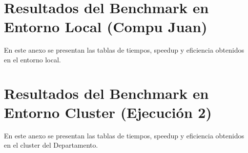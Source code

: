 \documentclass[a4paper,12pt,oneside,spanish]{book}
\begin{document}
    \pagestyle{plain}

    \tableofcontents
    \clearpage

    \mainmatter%
    
    
    
    
    

    \appendix
    
    \chapter{Resultados del Benchmark en Entorno Local (Compu Juan)}
    \label{appendix:local}
    En este anexo se presentan las tablas de tiempos, speedup y eficiencia obtenidos en el entorno local. 


    \chapter{Resultados del Benchmark en Entorno Cluster (Ejecución 2)}
    \label{appendix:cluster}
    En este anexo se presentan las tablas de tiempos, speedup y eficiencia obtenidos en el cluster del Departamento. 
\end{document}
